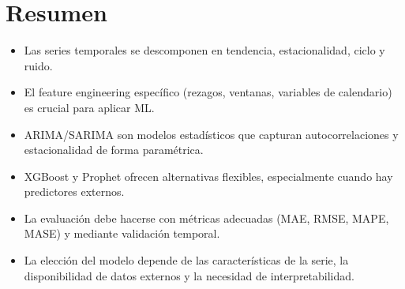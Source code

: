 \documentclass[12pt,a4paper,openany,oneside]{book}
\begin{document}
\section{Resumen}
\begin{itemize}
    \item Las series temporales se descomponen en tendencia, estacionalidad, ciclo y ruido.
    \item El feature engineering específico (rezagos, ventanas, variables de calendario) es crucial para aplicar ML.
    \item ARIMA/SARIMA son modelos estadísticos que capturan autocorrelaciones y estacionalidad de forma paramétrica.
    \item XGBoost y Prophet ofrecen alternativas flexibles, especialmente cuando hay predictores externos.
    \item La evaluación debe hacerse con métricas adecuadas (MAE, RMSE, MAPE, MASE) y mediante validación temporal.
    \item La elección del modelo depende de las características de la serie, la disponibilidad de datos externos y la necesidad de interpretabilidad.
\end{itemize}
\end{document}
